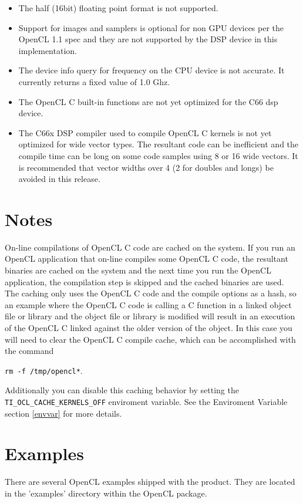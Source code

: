 \documentclass[10pt]{article}
\begin{document}
\begin{itemize}
\item The half (16bit) floating point format is not supported.

\item Support for images and samplers is optional for non GPU devices per the
OpenCL 1.1 spec and they are not supported by the DSP device in this
implementation.

\item The device info query for frequency on the CPU device is not accurate.  It
currently returns a fixed value of 1.0 Ghz.

\item The OpenCL C built-in functions are not yet optimized for the C66 dsp
device.  

\item The C66x DSP compiler used to compile OpenCL C kernels is not yet optimized for wide vector types.  The resultant code can be inefficient and the compile time
can be long on some code samples using 8 or 16 wide vectors.  It is recommended that vector widths over 4 (2 for doubles and longs) be avoided in this release.

\end{itemize}

\section{Notes}
On-line compilations of OpenCL C code are cached on the system. If you 
  run an OpenCL application that on-line compiles some OpenCL C code,
  the resultant binaries are cached on the system and the next time
  you run the OpenCL application, the compilation step is skipped and
  the cached binaries are used. The caching only uses the OpenCL C
  code and the compile options as a hash, so an example where the
  OpenCL C code is calling a C function in a linked object file or
  library and the object file or library is modified will result in an
  execution of the OpenCL C linked against the older version of the
  object.  In this case you will need to clear the OpenCL C compile
  cache, which can be accomplished with the command 

\verb!rm -f /tmp/opencl*!.

Additionally you can disable this caching behavior by setting the 
\verb!TI_OCL_CACHE_KERNELS_OFF! enviroment variable. See the Enviroment
Variable section \ref{envvar} for more details.

\newpage
\section{Examples}
There are several OpenCL examples shipped with the product.  They are located
in the 'examples' directory within the OpenCL package.
\end{document}
